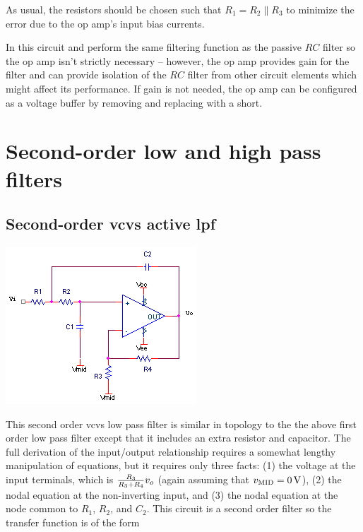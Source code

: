As usual, the resistors should be chosen such that \(R_1 = R_2 \parallel R_3\) to minimize the error due to the op amp's input bias currents.

In this circuit \R[1] and \C perform the same filtering function as the passive \(RC\) filter so the op amp isn't strictly necessary -- however, the op amp provides gain for the filter and can provide isolation of the \(RC\) filter from other circuit elements which might affect its performance.
If gain is not needed, the op amp can be configured as a voltage buffer by removing \R[2] and replacing \R[3] with a short.


\section{Second-order low and high pass filters}
\subsection{Second-order \acs{vcvs} active \acl{lpf}}
\begin{center}
	\includegraphics{schematics/2ndorder_vcvs_LPfilter.PNG}
\end{center}
This second order \ac{vcvs} low pass filter is similar in topology to the the above first order low pass filter except that it includes an extra resistor and capacitor.
The full derivation of the input/output relationship requires a somewhat lengthy manipulation of equations, but it requires only three facts: (1) the voltage at the input terminals, which is $\frac{R_3}{R_3 + R_4}\vout$ (again assuming that $v\sub{MID} = \SI{0}{\V}$), (2) the nodal equation at the non-inverting input, and (3) the nodal equation at the node common to $R_1$, $R_2$, and $C_2$.
This circuit is a second order filter so the transfer function is of the form

